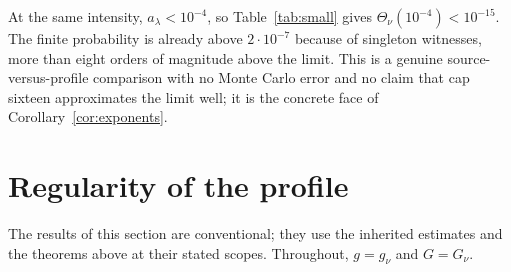 \documentclass[11pt,a4paper]{article}
\theoremstyle{plain}
\theoremstyle{definition}
\theoremstyle{remark}
\begin{document}
At the same intensity, $a_\lambda<10^{-4}$, so Table~\ref{tab:small} gives $\Theta_\nu(10^{-4})<10^{-15}$. The finite probability is already above $2\cdot10^{-7}$ because of singleton witnesses, more than eight orders of magnitude above the limit. This is a genuine source-versus-profile comparison with no Monte Carlo error and no claim that cap sixteen approximates the limit well; it is the concrete face of Corollary~\ref{cor:exponents}.

\section{Regularity of the profile}\label{sec:regularity}

The results of this section are conventional; they use the inherited estimates and the theorems above at their stated scopes. Throughout, $g=g_\nu$ and $G=G_\nu$.
\end{document}

